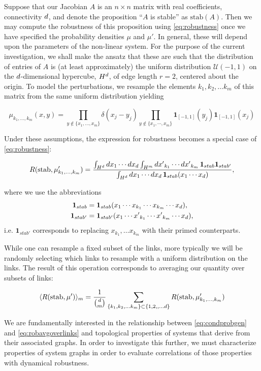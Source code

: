 Suppose that our Jacobian $A$ is an $n \times n$ matrix with real coefficients, connectivity $d$, and denote the proposition ``$A$ is stable'' as $\mathrm{stab}(A)$.  Then we may compute the robustness of this proposition using \ref{eq:robustness} once we have specified the probability densities $\mu$ and $\mu'$.  In general, these will depend upon the parameters of the non-linear system.  For the purpose of the current investigation, we shall make the ansatz that these are such that the distribution of entries of $A$ is (at least approximately) the uniform distribution $\mathcal{U}(-1,1)$ on the $d$-dimensional hypercube, $H^d$, of edge length $r=2$, centered about the origin. To model the perturbations, we resample the elements $k_1, k_2, \ldots k_m$ of this matrix from the same uniform distribution yielding
\begin{widetext}
$$
\mu_{k_1,\ldots,k_m}(x,y) = \prod_{y \notin \{x_1, \ldots, x_m\} } \delta(x_j-y_j) \prod_{y \notin \{x_1,\cdots,x_m\}} \mathbf{1}_{[-1,1]} (y_j) \mathbf{1}_{[-1,1]} (x_j)
$$
\end{widetext}
Under these assumptions, the expression for robustness becomes a special case of \ref{eq:robustness}:
\begin{widetext}
\begin{equation}\label{eq:condprobgen}
 R (\mathrm{stab}, \mu'_{k_1, \ldots, k_m}) =
  \frac{\int_{H^d} dx_1 \cdots dx_d \int_{H^m} {dx'}_{k_1} \cdots {dx'}_{k_m}\,
    \mathbf{1}_{stab} \mathbf{1}_{stab'}}
  {\int_{H^d} dx_1 \cdots dx_d  \, \mathbf{1}_{stab}(x_1 \cdots x_d)},
\end{equation}
\end{widetext}
where we use the abbreviations
\begin{align*}
\mathbf{1}_{stab} &= \mathbf{1}_{stab}(x_1 \cdots x_{k_1} \cdots x_{k_m} \cdots x_d), \\
\mathbf{1}_{stab'} &= \mathbf{1}_{stab'}(x_1 \cdots {x'}_{k_1} \cdots {x'}_{k_m}  \cdots x_d),
\end{align*}
i.e. $\mathbf{1}_{stab'}$ corresponds to replacing $x_{k_1}, \ldots x_{k_m}$ with their primed counterparts.

While one can resample a fixed subset of the links, more typically we will be randomly selecting which links to resample with a uniform distribution on the links.  The result of this operation corresponds to averaging our quantity over subsets of links:
\begin{widetext}
\begin{equation}\label{eq:robavgoverlinks}
\langle R (\hbox{stab}, \mu') \rangle_m =
\frac{1}{\binom{d}{m}}
\sum_{\{k_1, k_2, \ldots k_m\} \subset \{1, 2,, \ldots d\}}
R (\hbox{stab}, \mu'_{k_1, \ldots, k_m})
\end{equation}
\end{widetext}
We are fundamentally interested in the relationship between \ref{eq:condprobgen} and \ref{eq:robavgoverlinks} and topological properties of systems that derive from their associated graphs. In order to investigate this further, we must characterize properties of system graphs in order to evaluate correlations of those properties with dynamical robustness.

